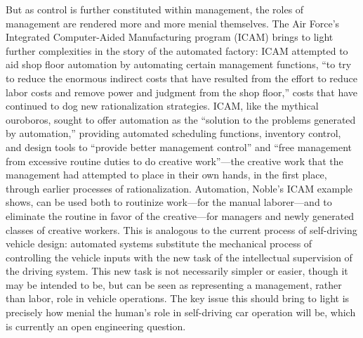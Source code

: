 But as control is further constituted within management, the roles of
management are rendered more and more menial themselves. The Air
Force's Integrated Computer-Aided Manufacturing program (ICAM)
brings to light further complexities in the story of the automated
factory: ICAM attempted to aid shop floor automation by automating certain
management functions, ``to try to reduce the enormous indirect costs
that have resulted from the effort to reduce labor costs and remove
power and judgment from the shop floor,'' costs that have continued to
dog new rationalization strategies.\cite[p. 330]{nobleForces} ICAM, like the mythical
ouroboros, sought to offer automation as the ``solution to the problems
generated by automation,'' providing automated scheduling functions,
inventory control, and design tools to ``provide better management
control'' and ``free management from excessive routine duties to do
creative work''---the creative work that the management had attempted to
place in their own hands, in the first place, through earlier
processes of rationalization.\cite[p. 330]{nobleForces} Automation, Noble's ICAM example shows,
can be used both to routinize work---for the manual laborer---and to
eliminate the routine in favor of the creative---for managers and newly
generated classes of creative workers. This is analogous to the
current process of self-driving vehicle design: automated systems
substitute the mechanical process of controlling the vehicle inputs
with the new task of the intellectual supervision of the driving
system. This new task is not necessarily simpler or easier, though it
may be intended to be, but can be seen as representing a management,
rather than labor, role in vehicle operations. The key issue this
should bring to light is
precisely how menial the human's role in self-driving car operation
will be, which is currently an open engineering question.


